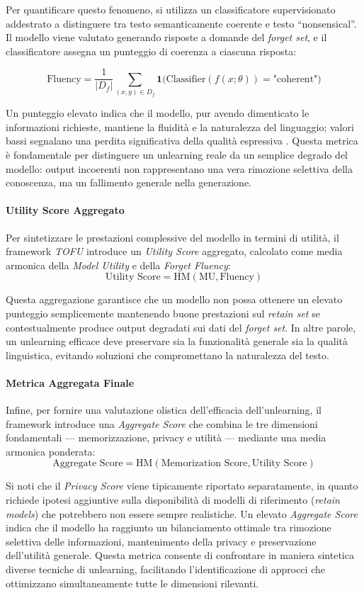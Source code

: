 Per quantificare questo fenomeno, si utilizza un classificatore supervisionato addestrato a distinguere tra testo semanticamente coerente e testo “nonsensical”.  
Il modello viene valutato generando risposte a domande del \textit{forget set}, e il classificatore assegna un punteggio di coerenza a ciascuna risposta:

\[
\text{Fluency} = \frac{1}{|D_f|} \sum_{(x,y) \in D_f} 
\mathbf{1} \Big( \text{Classifier}(f(x; \theta)) = \text{"coherent"} \Big)
\]

Un punteggio elevato indica che il modello, pur avendo dimenticato le informazioni richieste, mantiene la fluidità e la naturalezza del linguaggio; valori bassi segnalano una perdita significativa della qualità espressiva \cite{mekala-etal-2025-alternate}.  
Questa metrica è fondamentale per distinguere un unlearning reale da un semplice degrado del modello: output incoerenti non rappresentano una vera rimozione selettiva della conoscenza, ma un fallimento generale nella generazione.

\paragraph{Utility Score Aggregato}

Per sintetizzare le prestazioni complessive del modello in termini di utilità, il framework \textit{TOFU} introduce un \textit{Utility Score} aggregato, calcolato come media armonica della \textit{Model Utility} e della \textit{Forget Fluency}:
\[
\text{Utility Score} = \text{HM}(\text{MU}, \text{Fluency})
\]

Questa aggregazione garantisce che un modello non possa ottenere un elevato punteggio semplicemente mantenendo buone prestazioni sul \textit{retain set} se contestualmente produce output degradati sui dati del \textit{forget set}.  
In altre parole, un unlearning efficace deve preservare sia la funzionalità generale sia la qualità linguistica, evitando soluzioni che compromettano la naturalezza del testo.

\paragraph{Metrica Aggregata Finale}

Infine, per fornire una valutazione olistica dell’efficacia dell’unlearning, il framework introduce una \textit{Aggregate Score} che combina le tre dimensioni fondamentali — memorizzazione, privacy e utilità — mediante una media armonica ponderata:
\[
\text{Aggregate Score} = \text{HM}(\text{Memorization Score}, \text{Utility Score})
\]

Si noti che il \textit{Privacy Score} viene tipicamente riportato separatamente, in quanto richiede ipotesi aggiuntive sulla disponibilità di modelli di riferimento (\textit{retain models}) che potrebbero non essere sempre realistiche.  
Un elevato \textit{Aggregate Score} indica che il modello ha raggiunto un bilanciamento ottimale tra rimozione selettiva delle informazioni, mantenimento della privacy e preservazione dell’utilità generale.  
Questa metrica consente di confrontare in maniera sintetica diverse tecniche di unlearning, facilitando l’identificazione di approcci che ottimizzano simultaneamente tutte le dimensioni rilevanti.
